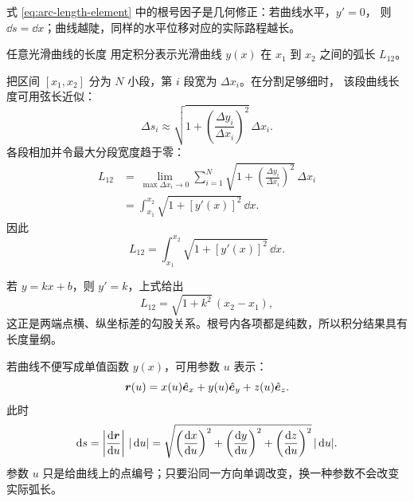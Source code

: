 \documentclass[UTF8,zihao=-4,oneside,openany]{ctexbook}
\begin{document}
\begin{center}
\end{center}

式 \eqref{eq:arc-length-element} 中的根号因子是几何修正：若曲线水平，$y'=0$，
则 $\dd s=\dd x$；曲线越陡，同样的水平位移对应的实际路程越长。

\begin{examplebox}{任意光滑曲线的长度}
用定积分表示光滑曲线 $y(x)$ 在 $x_1$ 到 $x_2$ 之间的弧长 $L_{12}$。

\tcblower
把区间 $[x_1,x_2]$ 分为 $N$ 小段，第 $i$ 段宽为 $\Delta x_i$。在分割足够细时，
该段曲线长度可用弦长近似：
\[
  \Delta s_i
  \approx\sqrt{1+\left(\frac{\Delta y_i}{\Delta x_i}\right)^2}\,\Delta x_i.
\]
各段相加并令最大分段宽度趋于零：
\begin{align*}
  L_{12}
  &=\lim_{\max\Delta x_i\to0}
    \sum_{i=1}^{N}\sqrt{1+\left(\frac{\Delta y_i}{\Delta x_i}\right)^2}\,\Delta x_i\\
  &=\int_{x_1}^{x_2}\sqrt{1+[y'(x)]^2}\,\dd x.
\end{align*}
因此
\begin{equation}
  \boxed{L_{12}=\int_{x_1}^{x_2}\sqrt{1+[y'(x)]^2}\,\dd x}.
  \label{eq:graph-arc-length}
\end{equation}

若 $y=kx+b$，则 $y'=k$，上式给出
\[
  L_{12}=\sqrt{1+k^2}\,(x_2-x_1),
\]
这正是两端点横、纵坐标差的勾股关系。根号内各项都是纯数，所以积分结果具有长度量纲。
\end{examplebox}

若曲线不便写成单值函数 $y(x)$，可用参数 $u$ 表示：
\[
  \bm{r}(u)=x(u)\hat{\bm{e}}_x+y(u)\hat{\bm{e}}_y+z(u)\hat{\bm{e}}_z.
\]
此时
\begin{equation}
  \dd s=\left|\frac{\dd\vect r}{\dd u}\right|\,|\dd u|
  =\sqrt{\left(\frac{\dd x}{\dd u}\right)^2
  +\left(\frac{\dd y}{\dd u}\right)^2
  +\left(\frac{\dd z}{\dd u}\right)^2}\,|\dd u|.
  \label{eq:parametric-arc-length}
\end{equation}
参数 $u$ 只是给曲线上的点编号；只要沿同一方向单调改变，换一种参数不会改变实际弧长。
\end{document}
